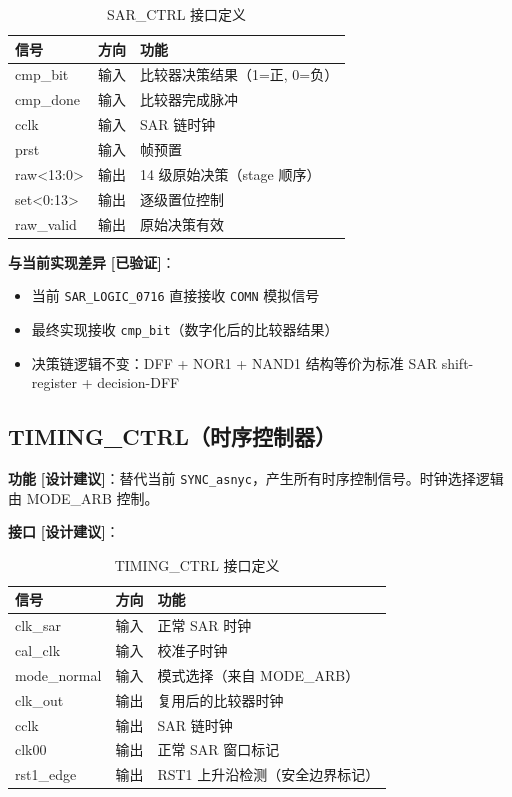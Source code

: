 \documentclass[UTF8,a4paper,11pt]{ctexart}
\newcommand{\verified}{\textcolor{verifiedgreen}{\textbf{[已验证]}}}
\newcommand{\suggested}{\textcolor{suggestblue}{\textbf{[设计建议]}}}
\begin{document}
\begin{table}[H]
\centering
\caption{SAR\_CTRL 接口定义}
\label{tab:sarctrl-interface}
\begin{tabular}{lll}
\toprule
信号 & 方向 & 功能 \\
\midrule
cmp\_bit   & 输入 & 比较器决策结果（1=正, 0=负） \\
cmp\_done  & 输入 & 比较器完成脉冲 \\
cclk       & 输入 & SAR 链时钟 \\
prst       & 输入 & 帧预置 \\
raw<13:0>  & 输出 & 14 级原始决策（stage 顺序） \\
set<0:13>  & 输出 & 逐级置位控制 \\
raw\_valid & 输出 & 原始决策有效 \\
\bottomrule
\end{tabular}
\end{table}

\textbf{与当前实现差异} \verified：
\begin{itemize}[leftmargin=2em]
\item 当前 \texttt{SAR\_LOGIC\_0716} 直接接收 \texttt{COMN} 模拟信号
\item 最终实现接收 \texttt{cmp\_bit}（数字化后的比较器结果）
\item 决策链逻辑不变：DFF + NOR1 + NAND1 结构等价为标准 SAR shift-register + decision-DFF
\end{itemize}

\subsection{TIMING\_CTRL（时序控制器）}

\textbf{功能} \suggested：替代当前 \texttt{SYNC\_asnyc}，产生所有时序控制信号。时钟选择逻辑由 MODE\_ARB 控制。

\textbf{接口} \suggested：

\begin{table}[H]
\centering
\caption{TIMING\_CTRL 接口定义}
\label{tab:timing-interface}
\begin{tabular}{lll}
\toprule
信号 & 方向 & 功能 \\
\midrule
clk\_sar    & 输入 & 正常 SAR 时钟 \\
cal\_clk    & 输入 & 校准子时钟 \\
mode\_normal & 输入 & 模式选择（来自 MODE\_ARB） \\
clk\_out    & 输出 & 复用后的比较器时钟 \\
cclk        & 输出 & SAR 链时钟 \\
clk00       & 输出 & 正常 SAR 窗口标记 \\
rst1\_edge  & 输出 & RST1 上升沿检测（安全边界标记） \\
\bottomrule
\end{tabular}
\end{table}
\end{document}

